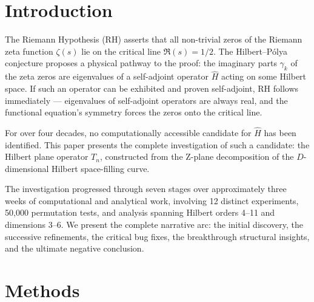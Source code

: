 \documentclass[11pt,a4paper]{article}
\begin{document}
\begin{abstract}
We conclude by characterizing precisely what a successful
Hilbert--P\'{o}lya operator must satisfy: self-adjointness in the limit,
GUE eigenvalue statistics, and eigenvalue density growing as $T\log T$.
The Hilbert plane operator satisfies none of these criteria, and no
optimization over curve constructions or dimensions can change this.
\end{abstract}

\section{Introduction}

The Riemann Hypothesis (RH) asserts that all non-trivial zeros of the Riemann
zeta function $\zeta(s)$ lie on the critical line $\Re(s) = 1/2$. The
Hilbert--P\'{o}lya conjecture proposes a physical pathway to the proof: the
imaginary parts $\gamma_k$ of the zeta zeros are eigenvalues of a
self-adjoint operator $\hat{H}$ acting on some Hilbert space. If such an
operator can be exhibited and proven self-adjoint, RH follows immediately ---
eigenvalues of self-adjoint operators are always real, and the functional
equation's symmetry forces the zeros onto the critical line.

For over four decades, no computationally accessible candidate for
$\hat{H}$ has been identified. This paper presents the complete
investigation of such a candidate: the Hilbert plane operator $T_n$,
constructed from the Z-plane decomposition of the $D$-dimensional Hilbert
space-filling curve.

The investigation progressed through seven stages over approximately three
weeks of computational and analytical work, involving 12 distinct
experiments, 50,000 permutation tests, and analysis spanning Hilbert orders
4--11 and dimensions 3--6. We present the complete narrative arc: the
initial discovery, the successive refinements, the critical bug fixes, the
breakthrough structural insights, and the ultimate negative conclusion.

\section{Methods}
\end{document}
